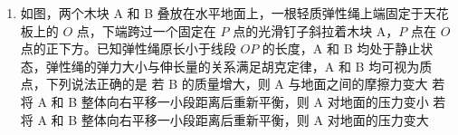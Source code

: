 \documentclass[\gkver]{gaokaozhenti}
\begin{document}
\begin{enumerate}
{B．由万有引力提供向心力有 $\frac{GMm}{r^{2}} = ma$，解得 $a = \frac{GM}{r^{2}}$，代入 $GM = gR^{2}$，可得 $a = \frac{gR^{2}}{r^{2}}$，故 B 正确；

C．由万有引力提供向心力有 $\frac{GMm}{r^{2}} = m\frac{4\pi^{2}}{T^{2}}r$，解得 $T = \sqrt{\frac{4\pi^{2}r^{3}}{GM}}$，代入 $GM = gR^{2}$，可得 $T = 2\pi\sqrt{\frac{r^{3}}{gR^{2}}}$，故 C 错误；

D．由万有引力提供向心力有 $\frac{GMm}{r^{2}} = m\omega^{2}r$，解得 $\omega = \sqrt{\frac{GM}{r^{3}}}$，代入 $GM = gR^{2}$，可得 $\omega = \sqrt{\frac{gR^{2}}{r^{3}}}$，故 D 错误。

故选 B。
}

\item
如图，两个木块 A 和 B 叠放在水平地面上，一根轻质弹性绳上端固定于天花板上的 $O$ 点，下端跨过一个固定在 $P$ 点的光滑钉子斜拉着木块 A，$P$ 点在 $O$ 点的正下方。已知弹性绳原长小于线段 $OP$ 的长度，A 和 B 均处于静止状态，弹性绳的弹力大小与伸长量的关系满足胡克定律，A 和 B 均可视为质点，下列说法正确的是
{若 B 的质量增大，则 A 与地面之间的摩擦力变大}
{若将 A 和 B 整体向右平移一小段距离后重新平衡，则 A 对地面的压力变小}
{若将 A 和 B 整体向右平移一小段距离后重新平衡，则 A 对地面的压力变大}

\end{enumerate}
\end{document}
